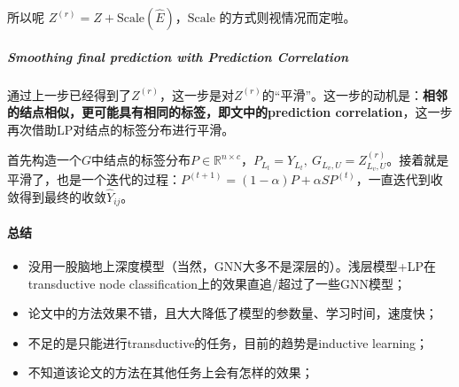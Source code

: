 所以呢 $Z^{(r)} = Z + \text{Scale}(\hat{E})$，$\text{Scale}$ 的方式则视情况而定啦。

\subparagraph{Smoothing final prediction with Prediction Correlation}
通过上一步已经得到了$Z^{(r)}$，这一步是对$Z^{(r)}$的“平滑”。这一步的动机是：\textbf{相邻的结点相似，更可能具有相同的标签，即文中的prediction correlation}，这一步再次借助LP对结点的标签分布进行平滑。

首先构造一个$G$中结点的标签分布$P \in \mathbb{R}^{n \times c}$，$P_{L_t} = Y_{L_t},\: G_{L_v, U} = Z^{(r)}_{L_v, U}$。接着就是平滑了，也是一个迭代的过程：$P^{(t+1)} = (1-\alpha)P + \alpha SP^{(t)}$，一直迭代到收敛得到最终的收敛$\hat{Y}_{ij}$。

\paragraph{总结}

\begin{itemize}

	\item 没用一股脑地上深度模型（当然，GNN大多不是深层的）。浅层模型+LP在transductive node classification上的效果直追/超过了一些GNN模型；
	\item 论文中的方法效果不错，且大大降低了模型的参数量、学习时间，速度快；
	\item 不足的是只能进行transductive的任务，目前的趋势是inductive learning；
	\item 不知道该论文的方法在其他任务上会有怎样的效果；

\end{itemize}

